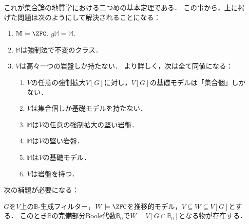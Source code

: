 \documentclass[a4j,leqno]{ltjsarticle}
\newcommand{\M}{\mathbb{M}}
\newcommand{\gM}{g\mathbb{M}}
\theoremstyle{nonumberplain}
\begin{document}
これが集合論の地質学における二つめの基本定理である．
この事から，上に掲げた問題は次のようにして解決されることになる：
\begin{theorem}
 \begin{enumerate}
  \item\label{item:M-zfc-gM=M} $\M \models \ZFC$, $\gM = \M$.
  \item\label{item:M-invariant} $\M$は強制法で不変のクラス．
  \item\label{item:bedrocks} $V$は高々一つの岩盤しか持たない．
        より詳しく，次は全て同値になる：
  \begin{enumerate}
   \item\label{item:gen-set-many-grounds} $V$の任意の強制拡大$V[G]$に対し，$V[G]$の基礎モデルは「集合個」しかない．
   \item\label{item:set-many-grounds} $V$は集合個しか基礎モデルを持たない．
   \item\label{item:gen-M-solid-ground} $\M$は$V$の任意の強制拡大の堅い岩盤．
   \item\label{item:M-solid-ground} $\M$は$V$の堅い岩盤．
   \item\label{item:M-is-ground} $\M$は$V$の基礎モデル．
   \item\label{item:V-has-bedrock} $V$は岩盤を持つ．
  \end{enumerate}
 \end{enumerate}
\end{theorem}
次の補題が必要になる：
\begin{fact}\label{lem:interm-ext}
 $G$を$V$上の$\mathbb{B}$-生成フィルター，$W \models \ZFC$を推移的モデル，$V \subseteq W \subseteq V[G]$とする．
 このとき$\mathbb{B}$の完備部分Boole代数$\mathbb{B}_0$で$W = V[G \cap \mathbb{B}_0]$となる物が存在する．
\end{fact}
\end{document}
